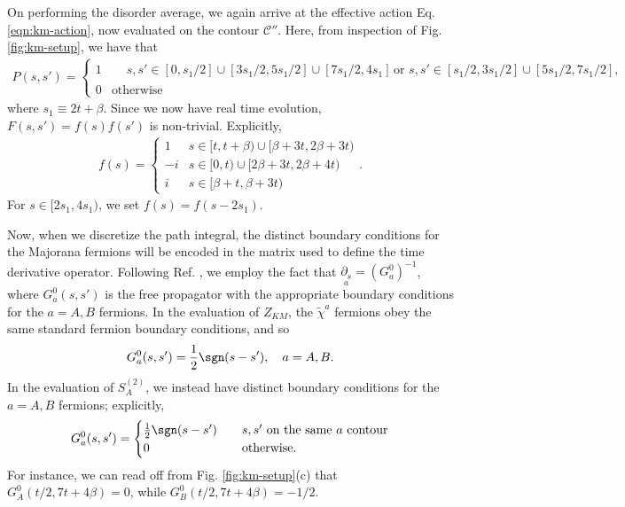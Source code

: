 \documentclass[reprint, floatfix,eqsecnum,superscriptaddress,preprint,nofootinbib,onecolumn,amsmath,amssymb,aps,prb]{revtex4-2}
\newcommand{\tchi}{\tilde{\chi}}
\begin{document}
On performing the disorder average, we again arrive at the effective action Eq. \eqref{eqn:km-action}, now evaluated on the contour $\mathcal{C}''$. Here, from inspection of Fig. \ref{fig:km-setup}, we have that
\begin{align}
    P(s,s') = \begin{cases}
        1 & \!\begin{aligned}  & s,s' \in [0,s_1/2]\cup[3s_1/2,5s_1/2]\cup[7s_1/2,4s_1] \, \text{or } s,s' \in [s_1/2,3s_1/2]\cup [5s_1/2,7s_1/2],
        \!\end{aligned} \\
        0 & \text{otherwise}
    \end{cases}
\end{align}
where $s_1 \equiv 2t+\beta$. Since we now have real time evolution, $F(s,s') = f(s) f(s')$ is non-trivial. Explicitly,
\begin{align}
    f(s) = \begin{cases}
    1 & s \in [t,t+\beta) \cup [\beta+3t,2\beta+3t) \\
    -i & s \in [0,t)\cup [2\beta+3t,2\beta+4t) \\
    i & s \in [\beta+t,\beta+3t)
    \end{cases}.
\end{align}
For $s \in [2s_1,4s_1)$, we set $f(s) = f(s-2s_1)$.

Now, when we discretize the path integral, the distinct boundary conditions for the Majorana fermions will be encoded in the matrix used to define the time derivative operator. %
Following Ref. \cite{Chen2020}, we employ the fact that $\underset{a}{\partial_s} = (G_a^0)^{-1}$,
where $G^0_a(s,s')$ is the free propagator with the appropriate boundary conditions for the $a=A,B$ fermions. 
In the evaluation of $Z_{KM}$, the $\tchi^a$ fermions obey the same standard fermion boundary conditions, and so 
\begin{align}
    G_a^0(s,s') = \frac{1}{2} \sgn(s-s'), \quad a= A,B.
\end{align}
In the evaluation of $S^{(2)}_A$, we instead have distinct boundary conditions for the $a=A,B$ fermions; explicitly,
\begin{align}
    G_{a}^0(s,s') = \begin{cases}
    \frac{1}{2} \sgn(s-s') \quad &s,s' \text{ on the same } a \text{ contour} \\
    0 \quad &\text{otherwise} .
    \end{cases} \label{eqn:free-green-fn-renyi}
\end{align}
For instance, we can read off from Fig. \ref{fig:km-setup}(c) that $G_{A}^0(t/2,7t+4\beta) = 0$, while $G_{B}^0(t/2,7t+4\beta) = -1/2$.
\end{document}
